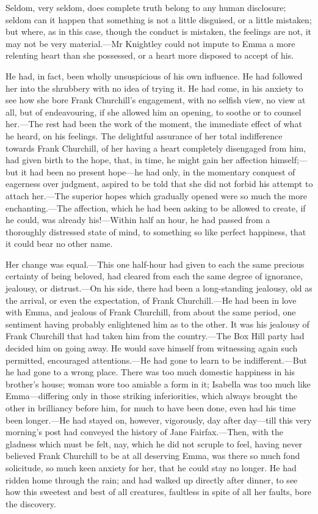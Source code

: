 Seldom, very seldom, does complete truth belong to any human disclosure; seldom can it happen that something is not a little disguised, or a little mistaken; but where, as in this case, though the conduct is mistaken, the feelings are not, it may not be very material.—Mr Knightley could not impute to Emma a more relenting heart than she possessed, or a heart more disposed to accept of his.

He had, in fact, been wholly unsuspicious of his own influence. He had followed her into the shrubbery with no idea of trying it. He had come, in his anxiety to see how she bore Frank Churchill's engagement, with no selfish view, no view at all, but of endeavouring, if she allowed him an opening, to soothe or to counsel her.—The rest had been the work of the moment, the immediate effect of what he heard, on his feelings. The delightful assurance of her total indifference towards Frank Churchill, of her having a heart completely disengaged from him, had given birth to the hope, that, in time, he might gain her affection himself;—but it had been no present hope—he had only, in the momentary conquest of eagerness over judgment, aspired to be told that she did not forbid his attempt to attach her.—The superior hopes which gradually opened were so much the more enchanting.—The affection, which he had been asking to be allowed to create, if he could, was already his!—Within half an hour, he had passed from a thoroughly distressed state of mind, to something so like perfect happiness, that it could bear no other name.

Her change was equal.—This one half-hour had given to each the same precious certainty of being beloved, had cleared from each the same degree of ignorance, jealousy, or distrust.—On his side, there had been a long-standing jealousy, old as the arrival, or even the expectation, of Frank Churchill.—He had been in love with Emma, and jealous of Frank Churchill, from about the same period, one sentiment having probably enlightened him as to the other. It was his jealousy of Frank Churchill that had taken him from the country.—The Box Hill party had decided him on going away. He would save himself from witnessing again such permitted, encouraged attentions.—He had gone to learn to be indifferent.—But he had gone to a wrong place. There was too much domestic happiness in his brother's house; woman wore too amiable a form in it; Isabella was too much like Emma—differing only in those striking inferiorities, which always brought the other in brilliancy before him, for much to have been done, even had his time been longer.—He had stayed on, however, vigorously, day after day—till this very morning's post had conveyed the history of Jane Fairfax.—Then, with the gladness which must be felt, nay, which he did not scruple to feel, having never believed Frank Churchill to be at all deserving Emma, was there so much fond solicitude, so much keen anxiety for her, that he could stay no longer. He had ridden home through the rain; and had walked up directly after dinner, to see how this sweetest and best of all creatures, faultless in spite of all her faults, bore the discovery.


